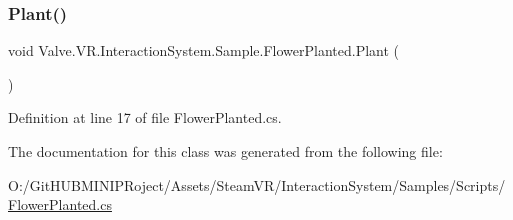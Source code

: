 \subsubsection{\texorpdfstring{Plant()}{Plant()}}
{\footnotesize\ttfamily void Valve.\+V\+R.\+Interaction\+System.\+Sample.\+Flower\+Planted.\+Plant (\begin{DoxyParamCaption}{ }\end{DoxyParamCaption})}



Definition at line 17 of file Flower\+Planted.\+cs.



The documentation for this class was generated from the following file\+:\begin{DoxyCompactItemize}
\item 
O\+:/\+Git\+H\+U\+B\+M\+I\+N\+I\+P\+Roject/\+Assets/\+Steam\+V\+R/\+Interaction\+System/\+Samples/\+Scripts/\mbox{\hyperlink{_flower_planted_8cs}{Flower\+Planted.\+cs}}\end{DoxyCompactItemize}
